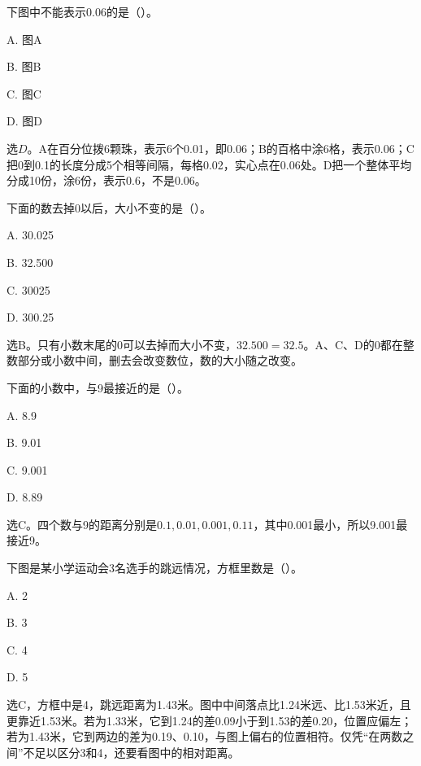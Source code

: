 下图中不能表示0.06的是（\hspace{1.8em}）。\par
\noindent A. 图A\par
\noindent B. 图B\par
\noindent C. 图C\par
\noindent D. 图D\par
{}
\begin{BookAnswer}
选\(D\)。A在百分位拨6颗珠，表示6个0.01，即0.06；B的百格中涂6格，表示0.06；C把0到0.1的长度分成5个相等间隔，每格0.02，实心点在0.06处。D把一个整体平均分成10份，涂6份，表示0.6，不是0.06。
\end{BookAnswer}

下面的数去掉0以后，大小不变的是（\hspace{1.8em}）。\par
\noindent A. 30.025\par
\noindent B. 32.500\par
\noindent C. 30025\par
\noindent D. 300.25\par
\begin{BookAnswer}
选B。只有小数末尾的0可以去掉而大小不变，\allowbreak{}\(32.500=32.5\)。A、C、D的0都在整数部分或小数中间，删去会改变数位，数的大小随之改变。
\end{BookAnswer}

下面的小数中，与9最接近的是（\hspace{1.8em}）。\par
\noindent A. 8.9\par
\noindent B. 9.01\par
\noindent C. 9.001\par
\noindent D. 8.89\par
\begin{BookAnswer}
选C。四个数与9的距离分别是\(0.1,0.01,0.001,0.11\)，其中0.001最小，所以9.001最接近9。
\end{BookAnswer}

下图是某小学运动会3名选手的跳远情况，方框里数是（\hspace{1.8em}）。\par
\noindent A. 2\par
\noindent B. 3\par
\noindent C. 4\par
\noindent D. 5\par
{}
\begin{BookAnswer}
选C，方框中是4，跳远距离为1.43米。图中中间落点比1.24米远、比1.53米近，且更靠近1.53米。若为1.33米，它到1.24的差0.09小于到1.53的差0.20，位置应偏左；若为1.43米，它到两边的差为0.19、0.10，与图上偏右的位置相符。仅凭“在两数之间”不足以区分3和4，还要看图中的相对距离。
\end{BookAnswer}

